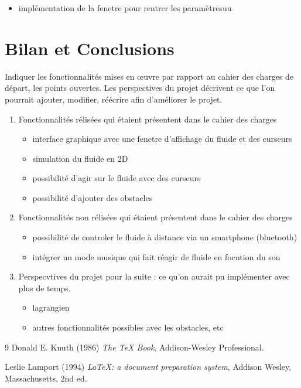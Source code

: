 \documentclass[a4paper]{article}
\begin{document}
\begin{enumerate}
\begin{itemize}
{        Enfin, cette nouvelle structure a facilité l'ajout de formes différentes et leur gestion
        dans la simulation, en rendant le système plus flexible et plus stable dans le temps.
    }   

\item implémentation de la fenetre pour rentrer les paramètresuu
\end{itemize}
\end{enumerate}

\section{Bilan et Conclusions}

	Indiquer les fonctionnalités mises en œuvre par rapport au cahier des charges de départ, les points ouvertes.
	Les perspectives du projet décrivent ce que l’on pourrait ajouter, modifier, réécrire afin d’améliorer le projet. 

\begin{enumerate}
    \item Fonctionnalités rélisées qui étaient présentent dans le cahier des charges 
    \begin{itemize}
        \item interface graphique avec une fenetre d'affichage du fluide et des curseurs
        \item simulation du fluide en 2D
        \item possibilité d'agir sur le fluide avec des curseurs
        \item possibilité d'ajouter des obstacles
    \end{itemize}

    \item Fonctionnalités non rélisées qui étaient présentent dans le cahier des charges
    \begin{itemize}
        \item possibilité de controler le fluide à distance via un smartphone (bluetooth)
        \item intégrer un mode musique qui fait réagir de fluide en focntion du son
    \end{itemize}
\item Perspecvtives du projet pour la suite : ce qu'on aurait pu implémenter avec plus de temps.
\begin{itemize}
    \item lagrangien
    \item autres fonctionnalités possibles avec les obstacles, etc
\end{itemize}
\end{enumerate}

\begin{thebibliography}{9}
Donald E. Knuth (1986) \emph{The \TeX{} Book}, Addison-Wesley Professional.

Leslie Lamport (1994) \emph{\LaTeX: a document preparation system}, Addison
Wesley, Massachusetts, 2nd ed.
\end{thebibliography}
\end{document}
